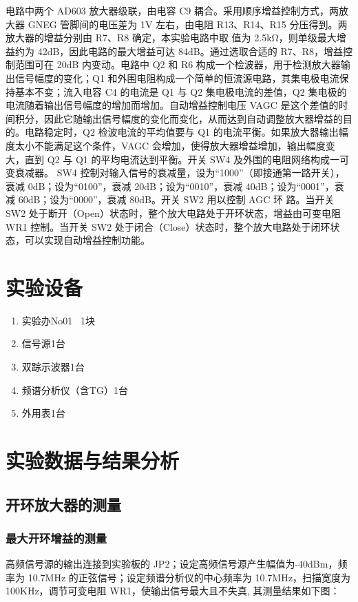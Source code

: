 \documentclass{../source/Experiment}
\begin{document}
电路中两个 AD603 放大器级联，由电容 C9 耦合。采用顺序增益控制方式，两放大器 GNEG 管脚间的电压差为 1V 左右，由电阻 R13、R14、R15 分压得到。两放大器的增益分别由 R7、R8 确定，本实验电路中取
值为 2.5kΩ，则单级最大增益约为 42dB，因此电路的最大增益可达 84dB。通过选取合适的 R7、R8，增益控制范围可在 20dB 内变动。电路中 Q2 和 R6 构成一个检波器，用于检测放大器输出信号幅度的变化；Q1 和外围电阻构成一个简单的恒流源电路，其集电极电流保持基本不变；流入电容 C4 的电流是 Q1 与 Q2 集电极电流的差值，Q2 集电极的电流随着输出信号幅度的增加而增加。自动增益控制电压 VAGC 是这个差值的时间积分，因此它随输出信号幅度的变化而变化，从而达到自动调整放大器增益的目的。电路稳定时，Q2 检波电流的平均值要与 Q1 的电流平衡。如果放大器输出幅度太小不能满足这个条件，VAGC 会增加，使得放大器增益增加，输出幅度变大，直到 Q2 与 Q1 的平均电流达到平衡。开关 SW4 及外围的电阻网络构成一可变衰减器。
SW4 控制对输入信号的衰减量，设为“1000”（即接通第一路开关），衰减 0dB；设为“0100”，衰减 20dB；设为“0010”，衰减 40dB；设为“0001”，衰减 60dB；设为“0000”，衰减 80dB。开关 SW2 用以控制 AGC 环
路。当开关 SW2 处于断开（Open）状态时，整个放大电路处于开环状态，增益由可变电阻 WR1 控制。当开关 SW2 处于闭合（Close）状态时，整个放大电路处于闭环状态，可以实现自动增益控制功能。


\section{实验设备}
\begin{enumerate}
    \item 实验办No01 \, 1块
    \item 信号源1台
    \item 双踪示波器1台
    \item 频谱分析仪（含TG）1台
    \item 外用表1台
\end{enumerate}

\section{实验数据与结果分析}
\subsection{开环放大器的测量}
\subsubsection{最大开环增益的测量}

高频信号源的输出连接到实验板的 JP2；设定高频信号源产生幅值为-40dBm，频率为 10.7MHz 的正弦信号；设定频谱分析仪的中心频率为 10.7MHz，扫描宽度为 100KHz，调节可变电阻 WR1，使输出信号最大且不失真, 其测量结果如下图：
\end{document}
